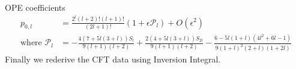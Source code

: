 \documentclass[12pt,a4paper,oneside]{book}
\theoremstyle{definition}
\begin{document}
            OPE coefficients
            \begin{align}
                p_{0,l} &= \frac{2^l (l+2)!(l+1)! }{(2l+1)!}(1+\epsilon\mathcal{P}_l) + O(\epsilon^2)\nonumber\\
                \text{where } \mathcal{P}_l &= -\frac{4(7+5l(3+l))S_l}{9(l+1)(l+2)} + \frac{2(4+5l(3+l))S_{2l}}{9(l+1)(l+2)}-\frac{6-5l(1+l)(4l^2+6l-1)}{9(1+l)^2(2+l)(1+2l)}
            \end{align}
            Finally we rederive the CFT data using Inversion Integral.

            
\end{document}
